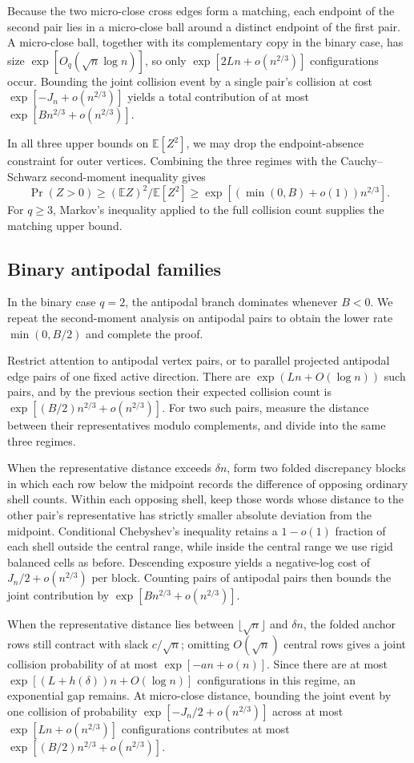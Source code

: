 Because the two micro-close cross edges form a matching, each endpoint of the second pair lies in a micro-close ball around a distinct endpoint of the first pair. A micro-close ball, together with its complementary copy in the binary case, has size $\exp[O_q(\sqrt n\log n)]$, so only $\exp[2Ln+o(n^{2/3})]$ configurations occur. Bounding the joint collision event by a single pair's collision at cost $\exp[-J_n+o(n^{2/3})]$ yields a total contribution of at most $\exp[Bn^{2/3}+o(n^{2/3})]$.

In all three upper bounds on $\mathbb E[Z^2]$, we may drop the endpoint-absence constraint for outer vertices. Combining the three regimes with the Cauchy--Schwarz second-moment inequality gives
\[
 \Pr(Z>0)\ge (\mathbb E Z)^2/\mathbb E[Z^2]
 \ge\exp[(\min(0,B)+o(1))n^{2/3}].
\]
For $q\ge3$, Markov's inequality applied to the full collision count supplies the matching upper bound.

\subsection{Binary antipodal families}
In the binary case $q=2$, the antipodal branch dominates whenever $B<0$. We repeat the second-moment analysis on antipodal pairs to obtain the lower rate $\min(0,B/2)$ and complete the proof.

Restrict attention to antipodal vertex pairs, or to parallel projected antipodal edge pairs of one fixed active direction. There are $\exp(Ln+O(\log n))$ such pairs, and by the previous section their expected collision count is $\exp[(B/2)n^{2/3}+o(n^{2/3})]$. For two such pairs, measure the distance between their representatives modulo complements, and divide into the same three regimes.

When the representative distance exceeds $\delta n$, form two folded discrepancy blocks in which each row below the midpoint records the difference of opposing ordinary shell counts. Within each opposing shell, keep those words whose distance to the other pair's representative has strictly smaller absolute deviation from the midpoint. Conditional Chebyshev's inequality retains a $1-o(1)$ fraction of each shell outside the central range, while inside the central range we use rigid balanced cells as before. Descending exposure yields a negative-log cost of $J_n/2+o(n^{2/3})$ per block. Counting pairs of antipodal pairs then bounds the joint contribution by $\exp[Bn^{2/3}+o(n^{2/3})]$.

When the representative distance lies between $\lfloor\sqrt n\rfloor$ and $\delta n$, the folded anchor rows still contract with slack $c/\sqrt n$; omitting $O(\sqrt n)$ central rows gives a joint collision probability of at most $\exp[-an+o(n)]$. Since there are at most $\exp[(L+h(\delta))n+O(\log n)]$ configurations in this regime, an exponential gap remains. At micro-close distance, bounding the joint event by one collision of probability $\exp[-J_n/2+o(n^{2/3})]$ across at most $\exp[Ln+o(n^{2/3})]$ configurations contributes at most $\exp[(B/2)n^{2/3}+o(n^{2/3})]$.

